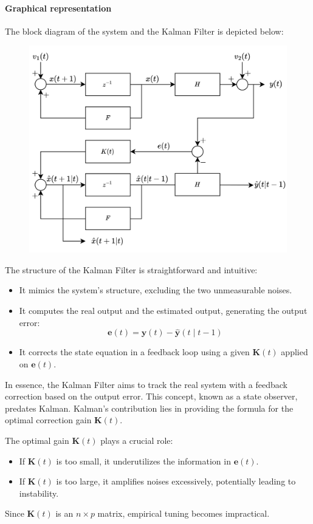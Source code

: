 \paragraph*{Graphical representation}
The block diagram of the system and the Kalman Filter is depicted below:
\begin{figure}[H]
    \centering
    \includegraphics[width=0.75\linewidth]{images/kalman.png}
\end{figure}
The structure of the Kalman Filter is straightforward and intuitive:
\begin{itemize}
    \item It mimics the system's structure, excluding the two unmeasurable noises.
    \item It computes the real output and the estimated output, generating the output error:
        \[\mathbf{e}(t)=\mathbf{y}(t)-\hat{\mathbf{y}}(t\mid t-1)\]
    \item It corrects the state equation in a feedback loop using a given $\mathbf{K}(t)$ applied on $\mathbf{e}(t)$. 
\end{itemize}
In essence, the Kalman Filter aims to track the real system with a feedback correction based on the output error. 
This concept, known as a state observer, predates Kalman. 
Kalman's contribution lies in providing the formula for the optimal correction gain $\mathbf{K}(t)$. 

The optimal gain $\mathbf{K}(t)$ plays a crucial role:
\begin{itemize}
    \item If $\mathbf{K}(t)$ is too small, it underutilizes the information in $\mathbf{e}(t)$. 
    \item If $\mathbf{K}(t)$ is too large, it amplifies noises excessively, potentially leading to instability.
\end{itemize}
Since $\mathbf{K}(t)$ is an $n \times p$ matrix, empirical tuning becomes impractical.